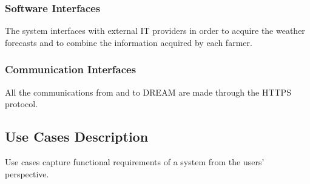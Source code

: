 \subsubsection{Software Interfaces}
The system interfaces with external IT providers in order to acquire the weather forecasts and to combine the information acquired by each farmer.
\subsubsection{Communication Interfaces}
All the communications from and to DREAM are made through the HTTPS protocol.

\newpage
\subsection{Use Cases Description}
Use cases capture functional requirements of a system from the users’ perspective.



